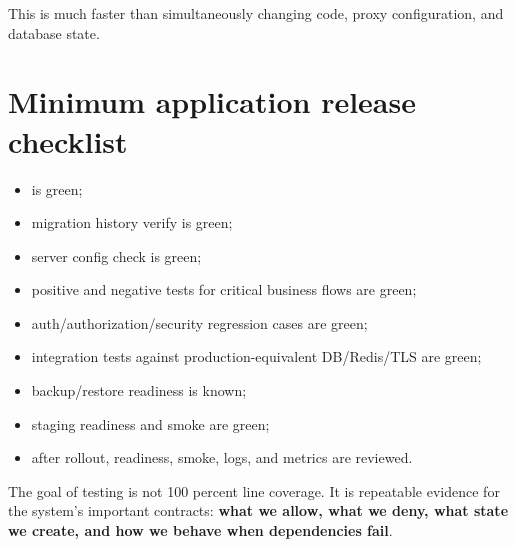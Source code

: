This is much faster than simultaneously changing code, proxy configuration, and database state.

\section{Minimum application release checklist}

\begin{itemize}
  \item {} is green;
  \item migration history verify is green;
  \item server config check is green;
  \item positive and negative tests for critical business flows are green;
  \item auth/authorization/security regression cases are green;
  \item integration tests against production-equivalent DB/Redis/TLS are green;
  \item backup/restore readiness is known;
  \item staging readiness and smoke are green;
  \item after rollout, readiness, smoke, logs, and metrics are reviewed.
\end{itemize}

The goal of testing is not 100 percent line coverage. It is repeatable evidence for the system's important contracts: \textbf{what we allow, what we deny, what state we create, and how we behave when dependencies fail}.
